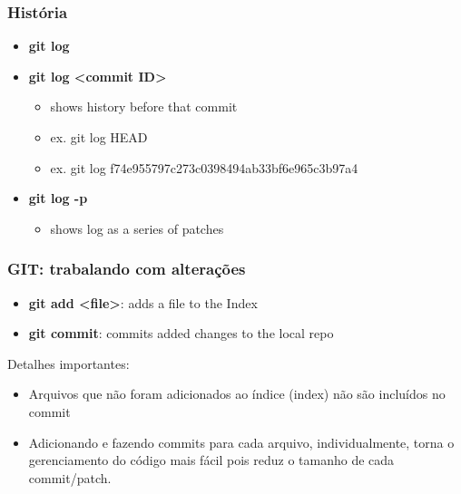 \begin{frame}
\frametitle{História}

\begin{itemize}
\item \textbf{git log}
\item \textbf{git log <commit ID>}
\begin{itemize}
\item shows history before that commit
\item ex. git log HEAD
\item ex.  git log f74e955797c273c0398494ab33bf6e965c3b97a4
\end{itemize}
\item \textbf{git log -p}
\begin{itemize}
\item shows log as a series of patches
\end{itemize}
\end{itemize}

\end{frame}


\begin{frame}
\frametitle{GIT: trabalando com alterações}


\begin{itemize}
\item \textbf{git add <file>}: adds a file to the Index
\item \textbf{git commit}:  commits added changes to the local repo
\end{itemize}

Detalhes importantes:

\begin{itemize}
\item Arquivos que não foram adicionados ao índice (index) não são incluídos no commit
\item Adicionando e fazendo commits para cada arquivo, individualmente, torna o gerenciamento do código mais fácil pois reduz o tamanho de cada commit/patch.
\end{itemize}

\end{frame}
